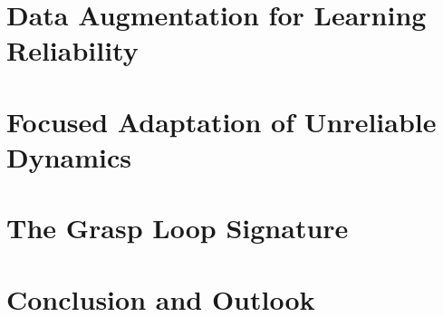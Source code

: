 \documentclass[reqno,12pt,oneside]{report} %
\begin{document}
\chapter{Data Augmentation for Learning Reliability}
\label{chap:DataAugmentation}

 
\chapter{Focused Adaptation of Unreliable Dynamics}
\label{chap:FOCUS}

 
\chapter{The Grasp Loop Signature}
\label{chap:GraspLoop}


\chapter{Conclusion and Outlook}
\label{chap:conclusion}




\startbibliography
 \begin{singlespace} %
 \end{singlespace}

%
\end{document}
